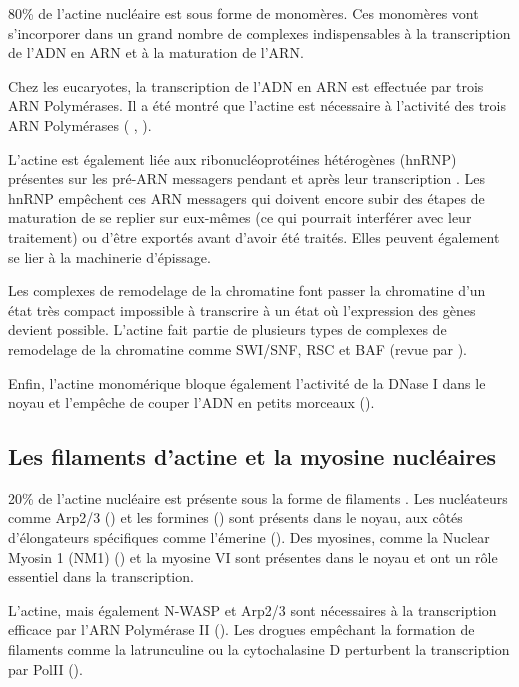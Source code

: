 80\% de l'actine nucléaire est sous forme de monomères. Ces monomères vont s'incorporer dans un grand nombre de complexes indispensables à la transcription de l'ADN en ARN et à la maturation de l'ARN. 

Chez les eucaryotes, la transcription de l'ADN en ARN est effectuée par trois ARN Polymérases. Il a été montré que l'actine est nécessaire à l'activité des trois ARN Polymérases ( \cite{ye_nuclear_2008}, \cite{hofmann_actin_2004} \cite{hu_role_2004}).

L'actine est également liée aux ribonucléoprotéines hétérogènes (hnRNP) présentes sur les pré-ARN messagers pendant et après leur transcription \cite{kukalev_actin_2005}. Les hnRNP empêchent ces ARN messagers qui doivent encore subir des étapes de maturation de se replier sur eux-mêmes (ce qui pourrait interférer avec leur traitement) ou d'être exportés avant d'avoir été traités. Elles peuvent également se lier à la machinerie d'épissage. 

Les complexes de remodelage de la chromatine font passer la chromatine d'un état très compact impossible à transcrire à un état où l'expression des gènes devient possible. L'actine fait partie de plusieurs types de complexes de remodelage de la chromatine comme SWI/SNF, RSC et BAF (revue par \cite{farrants_chromatin_2008}). 

Enfin, l'actine monomérique bloque également l'activité de la DNase I dans le noyau et l'empêche de couper l'ADN en petits morceaux (\cite{lazarides_actin_1974}). 

\subsection{Les filaments d'actine et la myosine nucléaires}

20\% de l'actine nucléaire est présente sous la forme de filaments \cite{mcdonald_nucleoplasmic_2006}. Les nucléateurs comme Arp2/3 (\cite{yoo_novel_2006}) et les formines (\cite{baarlink_nuclear_2013}) sont présents dans le noyau, aux côtés d'élongateurs spécifiques comme l'émerine (\cite{ho_lamin_2013}). 
Des myosines, comme la Nuclear Myosin 1 (NM1) (\cite{nowak_evidence_1997})  et la myosine VI sont présentes dans le noyau et ont un rôle essentiel dans la transcription. 

L'actine, mais également N-WASP et Arp2/3 sont nécessaires à la transcription efficace par l'ARN Polymérase II (\cite{yoo_novel_2006}). Les drogues empêchant la formation de filaments comme la latrunculine ou la cytochalasine D perturbent la transcription par PolII (\cite{mcdonald_nucleoplasmic_2006}).

